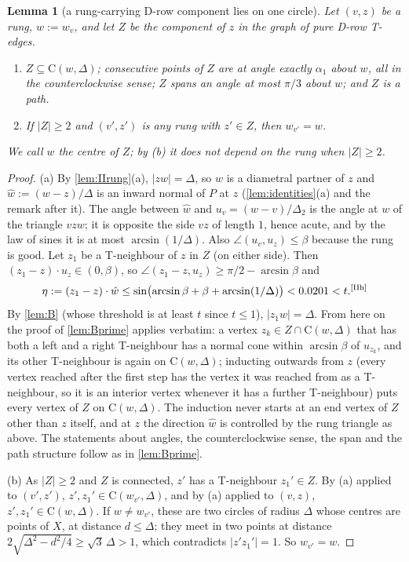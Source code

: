 \documentclass[11pt]{amsart}
\newtheorem{lemma}[theorem]{Lemma}
\theoremstyle{definition}
\theoremstyle{remark}
\newcommand{\Dt}{\Delta_2}
\newcommand{\Cc}{\mathrm{C}}      %
\newcommand{\chk}[1]{\textsuperscript{[#1]}}
\begin{document}
\begin{lemma}[a rung-carrying D-row component lies on one circle]\label{lem:IIZ}
Let $(v,z)$ be a rung, $w:=w_v$, and let $Z$ be the component of $z$ in the graph of pure D-row T-edges.
\begin{enumerate}[label=\textup{(\alph*)}]
\item $Z\subseteq\Cc(w,\Delta)$; consecutive points of $Z$ are at angle exactly $\alpha_1$ about $w$, all in the counterclockwise sense; $Z$ spans an angle at most $\pi/3$ about $w$; and $Z$ is a path.
\item If $|Z|\ge2$ and $(v',z')$ is any rung with $z'\in Z$, then $w_{v'}=w$.
\end{enumerate}
We call $w$ the \emph{centre} of $Z$; by \textup{(b)} it does not depend on the rung when $|Z|\ge2$.
\end{lemma}
\begin{proof}
(a) By \cref{lem:IIrung}(a), $|zw|=\Delta$, so $w$ is a diametral partner of $z$ and $\hat w:=(w-z)/\Delta$ is an inward normal of $P$ at $z$ (\cref{lem:identities}(a) and the remark after it). The angle between $\hat w$ and $u_v=(w-v)/\Dt$ is the angle at $w$ of the triangle $vzw$; it is opposite the side $vz$ of length $1$, hence acute, and by the law of sines it is at most $\arcsin(1/\Delta)$. Also $\angle(u_v,u_z)\le\beta$ because the rung is good. Let $z_1$ be a T-neighbour of $z$ in $Z$ (on either side). Then $(z_1-z)\cdot u_z\in(0,\beta)$, so $\angle(z_1-z,u_z)\ge\pi/2-\arcsin\beta$ and
\[
\eta:=(z_1-z)\cdot\hat w\le\sin\bigl(\arcsin\beta+\beta+\arcsin(1/\Delta)\bigr)<0.0201<t .\chk{IIh}
\]
By \cref{lem:B} (whose threshold is at least $t$ since $t\le1$), $|z_1w|=\Delta$. From here on the proof of \cref{lem:Bprime} applies verbatim: a vertex $z_k\in Z\cap\Cc(w,\Delta)$ that has both a left and a right T-neighbour has a normal cone within $\arcsin\beta$ of $u_{z_k}$, and its other T-neighbour is again on $\Cc(w,\Delta)$; inducting outwards from $z$ (every vertex reached after the first step has the vertex it was reached from as a T-neighbour, so it is an interior vertex whenever it has a further T-neighbour) puts every vertex of $Z$ on $\Cc(w,\Delta)$. The induction never starts at an end vertex of $Z$ other than $z$ itself, and at $z$ the direction $\hat w$ is controlled by the rung triangle as above. The statements about angles, the counterclockwise sense, the span and the path structure follow as in \cref{lem:Bprime}.

(b) As $|Z|\ge2$ and $Z$ is connected, $z'$ has a T-neighbour $z_1'\in Z$. By (a) applied to $(v',z')$, $z',z_1'\in\Cc(w_{v'},\Delta)$, and by (a) applied to $(v,z)$, $z',z_1'\in\Cc(w,\Delta)$. If $w\neq w_{v'}$, these are two circles of radius $\Delta$ whose centres are points of $X$, at distance $d\le\Delta$; they meet in two points at distance $2\sqrt{\Delta^2-d^2/4}\ge\sqrt3\,\Delta>1$, which contradicts $|z'z_1'|=1$. So $w_{v'}=w$.
\end{proof}
\end{document}
